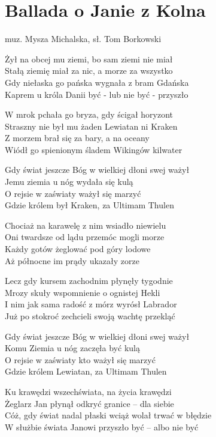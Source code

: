 \section{Ballada o Janie z Kolna}{muz. Mysza Michalska, sł. Tom Borkowski}
\begin{text}
Żył na obcej mu ziemi, bo sam ziemi nie miał\\
Stałą ziemię miał za nic, a morze za wszystko\\
Gdy niełaska go pańska wygnała z bram Gdańska\\
Kaprem u króla Danii być - lub nie być - przyszło

W mrok pchała go bryza, gdy ścigał horyzont\\
Straszny nie był mu żaden Lewiatan ni Kraken\\
Z morzem brał się za bary, a na oceany\\
Wiódł go spienionym śladem Wikingów kilwater

Gdy świat jeszcze Bóg w wielkiej dłoni swej ważył\\
Jemu ziemia u nóg wydała się kulą\\
O rejsie w zaświaty ważył się marzyć\\
Gdzie królem był Kraken, za Ultimam Thulen

Chociaż na karawelę z nim wsiadło niewielu\\
Oni twardsze od lądu przemóc mogli morze\\
Każdy gotów żeglować pod góry lodowe\\
Aż północne im prądy ukazały zorze

Lecz gdy kursem zachodnim płynęły tygodnie\\
Mrozy skuły wspomnienie o ognistej Hekli\\
I nim jak sama radość z mórz wyrósł Labrador\\
Już po stokroć zechcieli swoją wachtę przekląć

Gdy świat jeszcze Bóg w wielkiej dłoni swej ważył\\
Komu Ziemia u nóg zaczęła być kulą\\
O rejsie w zaświaty kto ważył się marzyć\\
Gdzie królem Lewiatan, za Ultimam Thulen

Ku krawędzi wszechświata, na życia krawędzi\\
Żeglarz Jan płynął odkryć granice – dla siebie\\
Cóż, gdy świat nadal płaski wciąż wolał trwać w błędzie\\
W służbie świata Janowi przyszło być – albo nie być
\end{text}